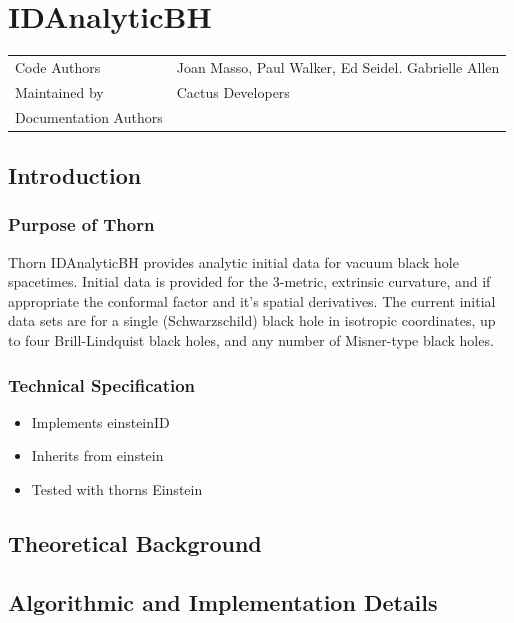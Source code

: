 \newcommand{\parameter}[1]{{\it #1}}



\chapter{IDAnalyticBH}

\begin{tabular}{@{}ll}
Code Authors & Joan Masso, Paul Walker, Ed Seidel. Gabrielle Allen \\
Maintained by & Cactus Developers \\
Documentation Authors & 
\end{tabular}

\section{Introduction}
  
\subsection{Purpose of Thorn}

Thorn IDAnalyticBH provides analytic initial data for vacuum black 
hole spacetimes. Initial data is provided for the 3-metric, extrinsic
curvature, and if appropriate the conformal factor and it's spatial 
derivatives. The current initial data sets are for a single (Schwarzschild)
black hole in isotropic coordinates, up to four Brill-Lindquist black 
holes, and any number of Misner-type black holes.

\subsection{Technical Specification}

\begin{itemize}

\item{Implements} einsteinID
\item{Inherits from} einstein
\item{Tested with thorns} Einstein

\end{itemize}

\section{Theoretical Background}


\section{Algorithmic and Implementation Details}

